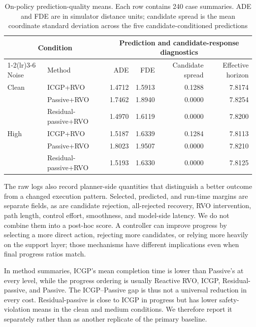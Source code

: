 \documentclass[pdflatex,sn-mathphys-num]{sn-jnl}
\begin{document}
\begin{table}[htbp]
\caption{On-policy prediction-quality means. Each row contains 240 case summaries. ADE and FDE are in simulator distance units; candidate spread is the mean coordinate standard deviation across the five candidate-conditioned predictions}
\label{tab:prediction-quality}
\centering
\scriptsize
\renewcommand{\arraystretch}{1.08}
\begin{tabular}{@{}llrrrr@{}}
\toprule
\multicolumn{2}{c}{Condition} & \multicolumn{4}{c}{Prediction and candidate-response diagnostics} \\
\cmidrule(lr){1-2}\cmidrule(lr){3-6}
Noise & Method & ADE & FDE & Candidate spread & Effective horizon \\
\midrule
Clean & ICGP+RVO & 1.4712 & 1.5913 & 0.1288 & 7.8174 \\
 & Passive+RVO & 1.7462 & 1.8940 & 0.0000 & 7.8254 \\
 & Residual-passive+RVO & 1.4970 & 1.6119 & 0.0000 & 7.8200 \\
High & ICGP+RVO & 1.5187 & 1.6339 & 0.1284 & 7.8113 \\
 & Passive+RVO & 1.8023 & 1.9507 & 0.0000 & 7.8210 \\
 & Residual-passive+RVO & 1.5193 & 1.6330 & 0.0000 & 7.8125 \\
\bottomrule
\end{tabular}
\end{table}

The raw logs also record planner-side quantities that distinguish a better outcome from a changed execution pattern. Selected, predicted, and run-time margins are separate fields, as are candidate rejection, all-rejected recovery, RVO intervention, path length, control effort, smoothness, and model-side latency. We do not combine them into a post-hoc score. A controller can improve progress by selecting a more direct action, rejecting more candidates, or relying more heavily on the support layer; those mechanisms have different implications even when final progress ratios match.

In method summaries, ICGP's mean completion time is lower than Passive's at every level, while the progress ordering is usually Reactive RVO, ICGP, Residual-passive, and Passive. The ICGP--Passive gap is thus not a universal reduction in every cost. Residual-passive is close to ICGP in progress but has lower safety-violation means in the clean and medium conditions. We therefore report it separately rather than as another replicate of the primary baseline.
\end{document}
